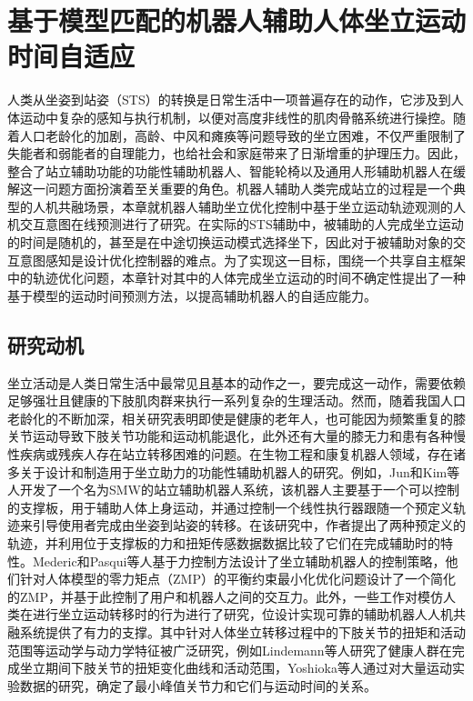 \chapter{基于模型匹配的机器人辅助人体坐立运动时间自适应}
人类从坐姿到站姿（STS）的转换是日常生活中一项普遍存在的动作，它涉及到人体运动中复杂的感知与执行机制，以便对高度非线性的肌肉骨骼系统进行操控。随着人口老龄化的加剧，高龄、中风和瘫痪等问题导致的坐立困难，不仅严重限制了失能者和弱能者的自理能力，也给社会和家庭带来了日渐增重的护理压力。因此，整合了站立辅助功能的功能性辅助机器人、智能轮椅以及通用人形辅助机器人在缓解这一问题方面扮演着至关重要的角色。机器人辅助人类完成站立的过程是一个典型的人机共融场景，本章就机器人辅助坐立优化控制中基于坐立运动轨迹观测的人机交互意图在线预测进行了研究。在实际的STS辅助中，被辅助的人完成坐立运动的时间是随机的，甚至是在中途切换运动模式选择坐下，因此对于被辅助对象的交互意图感知是设计优化控制器的难点。为了实现这一目标，围绕一个共享自主框架中的轨迹优化问题，本章针对其中的人体完成坐立运动的时间不确定性提出了一种基于模型的运动时间预测方法，以提高辅助机器人的自适应能力。
\section{研究动机}
坐立活动是人类日常生活中最常见且基本的动作之一，要完成这一动作，需要依赖足够强壮且健康的下肢肌肉群来执行一系列复杂的生理活动。然而，随着我国人口老龄化的不断加深，相关研究表明即使是健康的老年人，也可能因为频繁重复的膝关节运动导致下肢关节功能和运动机能退化\cite{heidariKneeOsteoarthritisPrevalence2011}，此外还有大量的膝无力和患有各种慢性疾病或残疾人存在站立转移困难的问题。在生物工程和康复机器人领域，存在诸多关于设计和制造用于坐立助力的功能性辅助机器人的研究。例如，Jun和Kim等人\cite{hong-guljunWalkingSittostandSupport2011,inhokimKinematicAnalysisSittostand2011}开发了一个名为SMW的站立辅助机器人系统，该机器人主要基于一个可以控制的支撑板，用于辅助人体上身运动，并通过控制一个线性执行器跟随一个预定义轨迹来引导使用者完成由坐姿到站姿的转移。在该研究中，作者提出了两种预定义的轨迹，并利用位于支撑板的力和扭矩传感数据数据比较了它们在完成辅助时的特性。Mederic和Pasqui等人\cite{medericElderlyPeopleSit2006}基于力控制方法设计了坐立辅助机器人的控制策略，他们针对人体模型的零力矩点（ZMP）的平衡约束最小化优化问题设计了一个简化的ZMP，并基于此控制了用户和机器人之间的交互力。此外，一些工作对模仿人类在进行坐立运动转移时的行为进行了研究，位设计实现可靠的辅助机器人人机共融系统提供了有力的支撑。其中针对人体坐立转移过程中的下肢关节的扭矩和活动范围等运动学与动力学特征被广泛研究，例如Lindemann等人\cite{galliQuantitativeAnalysisSit2008}研究了健康人群在完成坐立期间下肢关节的扭矩变化曲线和活动范围，Yoshioka等人\cite{yoshiokaBiomechanicalAnalysisRelation2009}通过对大量运动实验数据的研究，确定了最小峰值关节力和它们与运动时间的关系。

